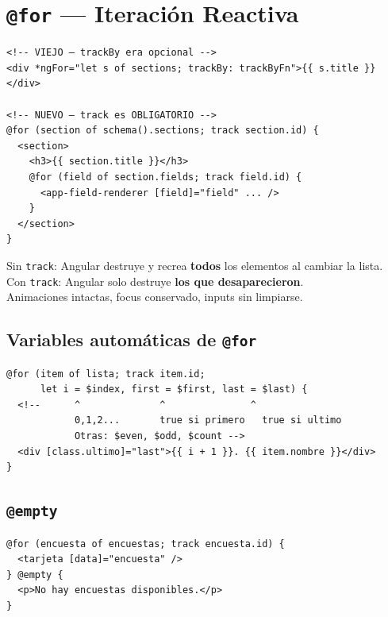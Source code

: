 \documentclass[12pt, a4paper]{article}
\begin{document}
\section{  \texttt{@for} — Iteración Reactiva}

\begin{lstlisting}
<!-- VIEJO — trackBy era opcional -->
<div *ngFor="let s of sections; trackBy: trackByFn">{{ s.title }}</div>

<!-- NUEVO — track es OBLIGATORIO -->
@for (section of schema().sections; track section.id) {
  <section>
    <h3>{{ section.title }}</h3>
    @for (field of section.fields; track field.id) {
      <app-field-renderer [field]="field" ... />
    }
  </section>
}
\end{lstlisting}

\begin{tcolorbox}[analogia, title={\emoji{id-button} \emoji{zap} Por qué \texttt{track} importa}]
  Sin \texttt{track}: Angular destruye y recrea \textbf{todos} los elementos al cambiar la lista.\\
  Con \texttt{track}: Angular solo destruye \textbf{los que desaparecieron}.\\
  Animaciones intactas, focus conservado, inputs sin limpiarse.
\end{tcolorbox}

\subsection{ Variables automáticas de \texttt{@for}}
\begin{lstlisting}
@for (item of lista; track item.id;
      let i = $index, first = $first, last = $last) {
  <!--      ^              ^               ^
            0,1,2...       true si primero   true si ultimo
            Otras: $even, $odd, $count -->
  <div [class.ultimo]="last">{{ i + 1 }}. {{ item.nombre }}</div>
}
\end{lstlisting}

\subsection{ \texttt{@empty}}
\begin{lstlisting}
@for (encuesta of encuestas; track encuesta.id) {
  <tarjeta [data]="encuesta" />
} @empty {
  <p>No hay encuestas disponibles.</p>
}
\end{lstlisting}
\end{document}
